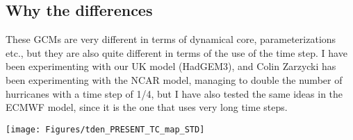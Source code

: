 \subsection{Why the differences}
These GCMs are very different in terms of dynamical core, parameterizations etc., but they are also quite different in terms of the use of the time step. I have been experimenting with our UK model (HadGEM3), and Colin Zarzycki has been experimenting with the NCAR model, managing to double the number of hurricanes with a time step of 1/4, but I have also tested the same ideas in the ECMWF model, since it is the one that uses very long time steps.
\begin{center}	
	\texttt{[image: Figures/tden\_PRESENT\_TC\_map\_STD]}
\end{center}